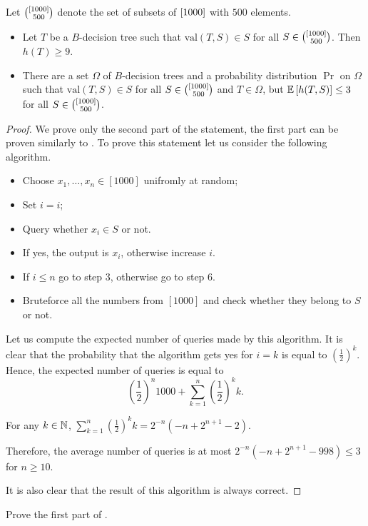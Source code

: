 \begin{theorem}
\label{theorem:guess-one-out-of-many}
  Let $\binom{{[{1000}]}}{500}$ denote the set of subsets of ${[{1000}]}$ with $500$
  elements.
  \begin{itemize}
    \item Let $T$ be a $B$-decision tree such that $\mathrm{val}(T, S) \in S$
      for all $S \in \binom{{[{1000}]}}{500}$. Then $h(T) \ge 9$.
    \item There are a set $\Omega$ of $B$-decision trees and a probability
      distribution $\Pr$ on $\Omega$ such that $\mathrm{val}(T, S) \in S$ for
      all $S \in \binom{{[{1000}]}}{500}$ and $T \in \Omega$, but
      $\mathbb{E}\left[h(T, S)\right] \le 3$ for all $S \in \binom{{[{1000}]}}{500}$.
  \end{itemize}
\end{theorem}
\begin{proof}
  We prove only the second part of the statement, the first part can be proven
  similarly to .
  To prove this statement let us consider the following algorithm.
  \begin{itemize}
    \item Choose $x_1, \dots, x_n \in [1000]$ unifromly at random;
    \item Set $i = i$;
    \item Query whether $x_i \in S$ or not.
    \item If yes, the output is $x_i$, otherwise increase $i$.
    \item If $i \le n$ go to step $3$, otherwise go to step $6$.
    \item Bruteforce all the numbers from $[1000]$ and check whether they belong
      to $S$ or not.
  \end{itemize}
  Let us compute the expected number of queries made by this algorithm. It is
  clear that the probability that the algorithm gets yes for $i = k$ is equal to
  $\left(\frac{1}{2}\right)^k$. Hence, the expected number of queries is equal
  to 
  \[
    \left(\frac{1}{2}\right)^n 1000 + 
    \sum_{k = 1}^n \left(\frac{1}{2}\right)^k k.
  \]

  \begin{claim}
      For any $k \in {\mathbb{N}}$, $\sum_{k = 1}^n \left(\frac{1}{2}\right)^k k = 
      2^{-n} (-n + 2^{n + 1} - 2)$.
  \end{claim}

  Therefore, the average number of queries is at most 
  $2^{-n} (-n + 2^{n + 1} - 998) \le 3$ for $n \ge 10$.

  It is also clear that the result of this algorithm is always correct.
\end{proof}

\begin{chapterendexercises}
  \exercise Prove the first part of .
\end{chapterendexercises}
